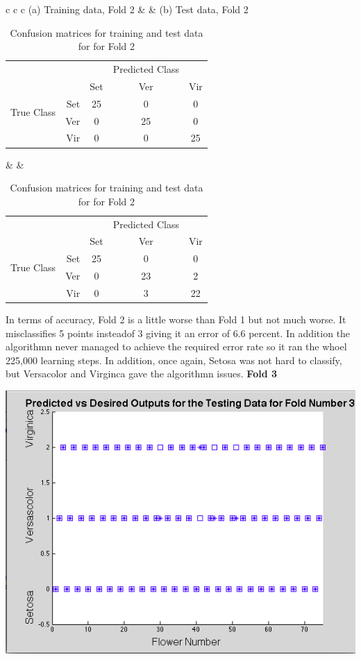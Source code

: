 \documentclass[epsfig]{article}
\begin{document}
\begin{table}[htp]
\caption{Confusion matrices for training and test data for for Fold 2}
\begin{tabular}{c c c}
	(a) Training data, Fold 2 & &
	(b) Test data, Fold 2 \\
		\begin{tabular} {rrccc}
	&	&	&Predicted Class&	\\
	\multirow{4}{*}{\begin{sideways} True Class \end{sideways}}	&	&Set	&Ver	&Vir	\\
	&Set	&25	&0	&0	\\
	&Ver	&0	&25	&0	\\
	&Vir	&0	&0	&25	\\
	\end{tabular}  & &
	\begin{tabular} {rrccc}
	&		&		&Predicted Class&		\\
	\multirow{4}{*}{\begin{sideways} True Class \end{sideways}}	&		&Set	&Ver	&Vir	\\
	&Set	&25		&0		&0		\\
	&Ver	&0		&23		&2		\\
	&Vir	&0		&3		&22		\\
	\end{tabular}  
\end{tabular}  	
\end{table}
In terms of accuracy, Fold 2 is a little worse than Fold 1 but not much worse. It misclassifies 5 points insteadof 3 giving it an error of 6.6 percent. In addition the algorithmn never managed to achieve the required error rate so it ran the whoel 225,000 learning steps. In addition, once again, Setosa was not hard to classify, but Versacolor and Virginca gave the algorithmn issues.
\newpage
\textbf{Fold 3}
\begin{center}
\includegraphics[scale=0.6]{pic6}
\end{center}
\end{document}
